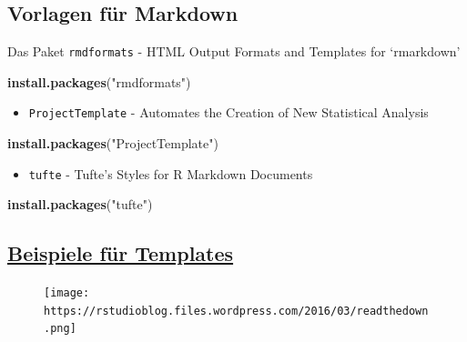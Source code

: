 \documentclass[]{article}
\newenvironment{Shaded}{\begin{snugshade}}{\end{snugshade}}
\newcommand{\KeywordTok}[1]{\textcolor[rgb]{0.13,0.29,0.53}{\textbf{#1}}}
\newcommand{\StringTok}[1]{\textcolor[rgb]{0.31,0.60,0.02}{#1}}
\newcommand{\NormalTok}[1]{#1}
\providecommand{\tightlist}{%
  \setlength{\itemsep}{0pt}\setlength{\parskip}{0pt}}
\begin{document}
\subsection{Vorlagen für Markdown}\label{vorlagen-fur-markdown}

Das Paket \texttt{rmdformats} - HTML Output Formats and Templates for
`rmarkdown'

\begin{Shaded}
\begin{Highlighting}[]
\KeywordTok{install.packages}\NormalTok{(}\StringTok{"rmdformats"}\NormalTok{)}
\end{Highlighting}
\end{Shaded}

\begin{itemize}
\tightlist
\item
  \texttt{ProjectTemplate} - Automates the Creation of New Statistical
  Analysis
\end{itemize}

\begin{Shaded}
\begin{Highlighting}[]
\KeywordTok{install.packages}\NormalTok{(}\StringTok{"ProjectTemplate"}\NormalTok{)}
\end{Highlighting}
\end{Shaded}

\begin{itemize}
\tightlist
\item
  \texttt{tufte} - Tufte's Styles for R Markdown Documents
\end{itemize}

\begin{Shaded}
\begin{Highlighting}[]
\KeywordTok{install.packages}\NormalTok{(}\StringTok{"tufte"}\NormalTok{)}
\end{Highlighting}
\end{Shaded}

\subsection{\texorpdfstring{\href{https://github.com/juba/rmdformats}{\textbf{Beispiele
für
Templates}}}{Beispiele für Templates}}\label{beispiele-fur-templates}

\begin{figure}
\centering
\texttt{[image: https://rstudioblog.files.wordpress.com/2016/03/readthedown.png]}
\caption{}
\end{figure}
\end{document}
